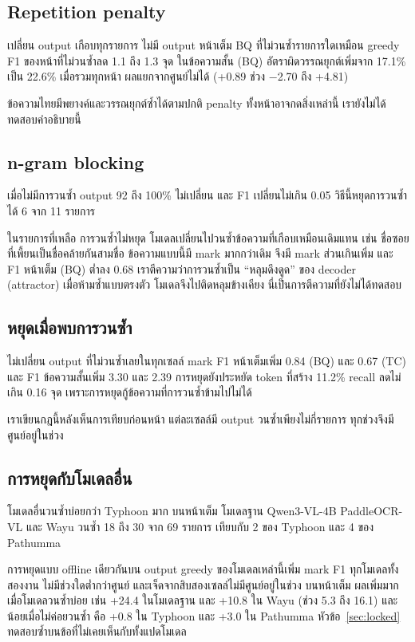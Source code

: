 \subsection{Repetition penalty}
เปลี่ยน output เกือบทุกรายการ ไม่มี output หน้าเต็ม BQ ที่ไม่วนซ้ำรายการใดเหมือน greedy F1 ของหน้าที่ไม่วนซ้ำลด 1.1 ถึง 1.3 จุด ในข้อความสั้น (BQ) อัตราผิดวรรณยุกต์เพิ่มจาก 17.1\% เป็น 22.6\% เมื่อรวมทุกหน้า ผลแยกจากศูนย์ไม่ได้ (+0.89 ช่วง $-$2.70 ถึง +4.81)

ข้อความไทยมีพยางค์และวรรณยุกต์ซ้ำได้ตามปกติ penalty ทั้งหน้าอาจกดสิ่งเหล่านี้ เรายังไม่ได้ทดสอบคำอธิบายนี้

\subsection{n-gram blocking}
เมื่อไม่มีการวนซ้ำ output 92 ถึง 100\% ไม่เปลี่ยน และ F1 เปลี่ยนไม่เกิน 0.05 วิธีนี้หยุดการวนซ้ำได้ 6 จาก 11 รายการ

ในรายการที่เหลือ การวนซ้ำไม่หยุด โมเดลเปลี่ยนไปวนซ้ำข้อความที่เกือบเหมือนเดิมแทน เช่น ชื่อซอยที่เพี้ยนเป็นชื่อคล้ายกันสามชื่อ ข้อความแบบนี้มี mark มากกว่าเดิม จึงมี mark ส่วนเกินเพิ่ม และ F1 หน้าเต็ม (BQ) ต่ำลง 0.68 เราตีความว่าการวนซ้ำเป็น ``หลุมดึงดูด'' ของ decoder (attractor) เมื่อห้ามซ้ำแบบตรงตัว โมเดลจึงไปติดหลุมข้างเคียง นี่เป็นการตีความที่ยังไม่ได้ทดสอบ

\subsection{หยุดเมื่อพบการวนซ้ำ}
ไม่เปลี่ยน output ที่ไม่วนซ้ำเลยในทุกเซลล์ mark F1 หน้าเต็มเพิ่ม 0.84 (BQ) และ 0.67 (TC) และ F1 ข้อความสั้นเพิ่ม 3.30 และ 2.39 การหยุดยังประหยัด token ที่สร้าง 11.2\% recall ลดไม่เกิน 0.16 จุด เพราะการหยุดกู้ข้อความที่การวนซ้ำข้ามไปไม่ได้

เราเขียนกฎนี้หลังเห็นการเทียบก่อนหน้า แต่ละเซลล์มี output วนซ้ำเพียงไม่กี่รายการ ทุกช่วงจึงมีศูนย์อยู่ในช่วง

\subsection{การหยุดกับโมเดลอื่น}
โมเดลอื่นวนซ้ำบ่อยกว่า Typhoon มาก บนหน้าเต็ม โมเดลฐาน Qwen3-VL-4B PaddleOCR-VL และ Wayu วนซ้ำ 18 ถึง 30 จาก 69 รายการ เทียบกับ 2 ของ Typhoon และ 4 ของ Pathumma

การหยุดแบบ offline เดียวกันบน output greedy ของโมเดลเหล่านี้เพิ่ม mark F1 ทุกโมเดลทั้งสองงาน ไม่มีช่วงใดต่ำกว่าศูนย์ และเจ็ดจากสิบสองเซลล์ไม่มีศูนย์อยู่ในช่วง บนหน้าเต็ม ผลเพิ่มมากเมื่อโมเดลวนซ้ำบ่อย เช่น +24.4 ในโมเดลฐาน และ +10.8 ใน Wayu (ช่วง 5.3 ถึง 16.1) และน้อยเมื่อไม่ค่อยวนซ้ำ คือ +0.8 ใน Typhoon และ +3.0 ใน Pathumma หัวข้อ~\ref{sec:locked} ทดสอบซ้ำบนข้อที่ไม่เคยเห็นกับทั้งแปดโมเดล


